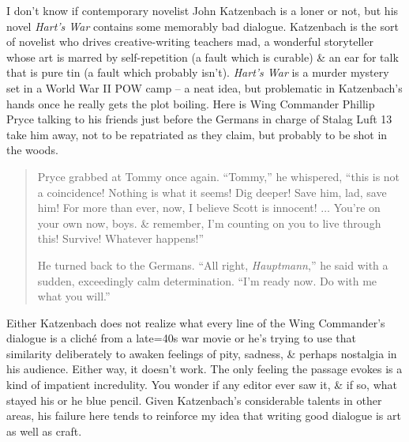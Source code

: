 \documentclass{article}
\numberwithin{equation}{section}
\begin{document}
I don't know if contemporary novelist John Katzenbach is a loner or not, but his novel \textit{Hart's War} contains some memorably bad dialogue. Katzenbach is the sort of novelist who drives creative-writing teachers mad, a wonderful storyteller whose art is marred by self-repetition (a fault which is curable) \& an ear for talk that is pure tin (a fault which probably isn't). \textit{Hart's War} is a murder mystery set in a World War II POW camp -- a neat idea, but problematic in Katzenbach's hands once he really gets the plot boiling. Here is Wing Commander Phillip Pryce talking to his friends just before the Germans in charge of Stalag Luft 13 take him away, not to be repatriated as they claim, but probably to be shot in the woods.
\begin{quotation}
	Pryce grabbed at Tommy once again. ``Tommy,'' he whispered, ``this is not a coincidence! Nothing is what it seems! Dig deeper! Save him, lad, save him! For more than ever, now, I believe Scott is innocent! $\ldots$ You're on your own now, boys. \& remember, I'm counting on you to live through this! Survive! Whatever happens!''
	
	He turned back to the Germans. ``All right, \textit{Hauptmann},'' he said with a sudden, exceedingly calm determination. ``I'm ready now. Do with me what you will.''
\end{quotation}
Either Katzenbach does not realize what every line of the Wing Commander's dialogue is a clich\'e from a late=40s war movie or he's trying to use that similarity deliberately to awaken feelings of pity, sadness, \& perhaps nostalgia in his audience. Either way, it doesn't work. The only feeling the passage evokes is a kind of impatient incredulity. You wonder if any editor ever saw it, \& if so, what stayed his or he blue pencil. Given Katzenbach's considerable talents in other areas, his failure here tends to reinforce my idea that writing good dialogue is art as well as craft.
\end{document}
